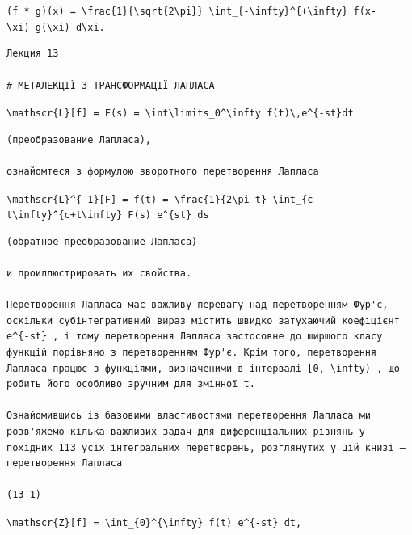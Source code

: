 \documentclass[
  ukrainian,
]{article}
\begin{document}
\texttt{(f\ *\ g)(x)\ =\ \textbackslash{}frac\{1\}\{\textbackslash{}sqrt\{2\textbackslash{}pi\}\}\ \textbackslash{}int\_\{-\textbackslash{}infty\}\^{}\{+\textbackslash{}infty\}\ f(x-\textbackslash{}xi)\ g(\textbackslash{}xi)\ d\textbackslash{}xi.}

\begin{verbatim}
Лекция 13

# МЕТАЛЕКЦІЇ З ТРАНСФОРМАЦІЇ ЛАПЛАСА
\end{verbatim}

\texttt{\textbackslash{}mathscr\{L\}{[}f{]}\ =\ F(s)\ =\ \textbackslash{}int\textbackslash{}limits\_0\^{}\textbackslash{}infty\ f(t)\textbackslash{},e\^{}\{-st\}dt}

\begin{verbatim}
(преобразование Лапласа),

ознайомтеся з формулою зворотного перетворення Лапласа
\end{verbatim}

\texttt{\textbackslash{}mathscr\{L\}\^{}\{-1\}{[}F{]}\ =\ f(t)\ =\ \textbackslash{}frac\{1\}\{2\textbackslash{}pi\ t\}\ \textbackslash{}int\_\{c-t\textbackslash{}infty\}\^{}\{c+t\textbackslash{}infty\}\ F(s)\ e\^{}\{st\}\ ds}

\begin{verbatim}
(обратное преобразование Лапласа)

и проиллюстрировать их свойства.

Перетворення Лапласа має важливу перевагу над перетворенням Фур'є, оскільки субінтегративний вираз містить швидко затухаючий коефіцієнт e^{-st} , і тому перетворення Лапласа застосовне до ширшого класу функцій порівняно з перетворенням Фур'є. Крім того, перетворення Лапласа працює з функціями, визначеними в інтервалі [0, \infty) , що робить його особливо зручним для змінної t.

Ознайомившись із базовими властивостями перетворення Лапласа ми розв'яжемо кілька важливих задач для диференціальних рівнянь у похідних 113 усіх інтегральних перетворень, розглянутих у цій книзі — перетворення Лапласа

(13 1)
\end{verbatim}

\texttt{\textbackslash{}mathscr\{Z\}{[}f{]}\ =\ \textbackslash{}int\_\{0\}\^{}\{\textbackslash{}infty\}\ f(t)\ e\^{}\{-st\}\ dt,}
\end{document}
